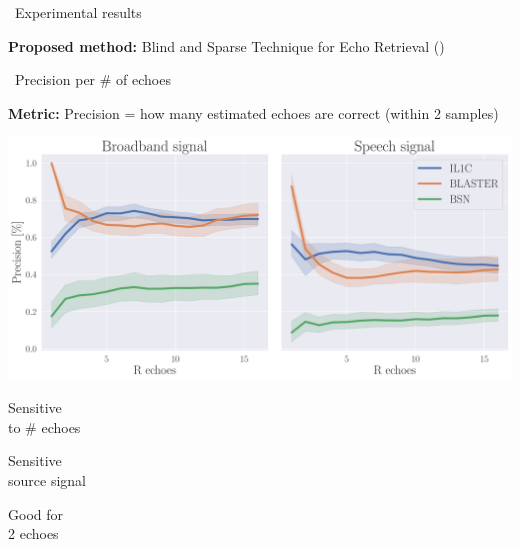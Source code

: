 \begin{frame}{\faFlask~Experimental results \hfill\faJediOrder}
    \pause
    \vfill
    \begin{mycontriblock}
        \textbf{Proposed method:} Blind and Sparse Technique for Echo Retrieval (\blaster)
    \end{mycontriblock}


\end{frame}


\begin{frame}{\faFlask~Precision per \# of echoes \hfill\faJediOrder}

    \textbf{Metric:} \alert{Precision} = how many estimated echoes are correct (within 2 samples)

    \pause[2]
    \begin{center}
        \includegraphics[width=0.8\linewidth]{figures/p_k-7_thr-2_bns_crocco_blaster-peak_withRechoes.pdf}
        \\
    \end{center}

    \pause[3]
    \begin{center}
        \textcolor{myred}{\xmark \: \parbox{8em}{Sensitive\\to \# echoes}}
        \quad\textcolor{myred}{\xmark \: \parbox{8em}{Sensitive\\source signal}}
        \quad\textcolor{mygreen}{\cmark \: \parbox{8em}{Good for\\2 echoes}}
    \end{center}



\end{frame}


